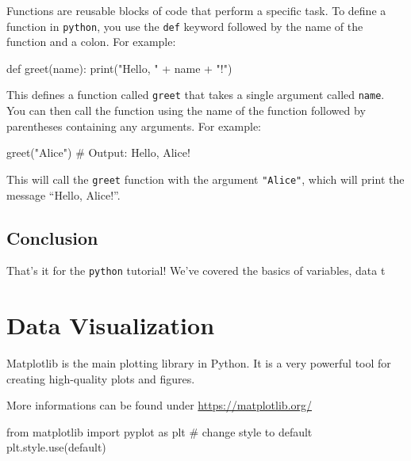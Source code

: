 \documentclass[
  letterpaper,
]{article}
\newenvironment{Shaded}{\begin{snugshade}}{\end{snugshade}}
\newcommand{\BuiltInTok}[1]{\textcolor[rgb]{0.00,0.23,0.31}{#1}}
\newcommand{\CommentTok}[1]{\textcolor[rgb]{0.37,0.37,0.37}{#1}}
\newcommand{\ImportTok}[1]{\textcolor[rgb]{0.00,0.46,0.62}{#1}}
\newcommand{\KeywordTok}[1]{\textcolor[rgb]{0.00,0.23,0.31}{#1}}
\newcommand{\NormalTok}[1]{\textcolor[rgb]{0.00,0.23,0.31}{#1}}
\newcommand{\OperatorTok}[1]{\textcolor[rgb]{0.37,0.37,0.37}{#1}}
\newcommand{\StringTok}[1]{\textcolor[rgb]{0.13,0.47,0.30}{#1}}
\begin{document}
Functions are reusable blocks of code that perform a specific task. To
define a function in \texttt{python}, you use the \texttt{def} keyword
followed by the name of the function and a colon. For example:

\begin{Shaded}
\begin{Highlighting}[]
\KeywordTok{def}\NormalTok{ greet(name):}
  \BuiltInTok{print}\NormalTok{(}\StringTok{"Hello, "} \OperatorTok{+}\NormalTok{ name }\OperatorTok{+} \StringTok{"!"}\NormalTok{)}
\end{Highlighting}
\end{Shaded}

This defines a function called \texttt{greet} that takes a single
argument called \texttt{name}. You can then call the function using the
name of the function followed by parentheses containing any arguments.
For example:

\begin{Shaded}
\begin{Highlighting}[]
\NormalTok{greet(}\StringTok{"Alice"}\NormalTok{) }\CommentTok{\# Output: Hello, Alice!}
\end{Highlighting}
\end{Shaded}

This will call the \texttt{greet} function with the argument
\texttt{"Alice"}, which will print the message ``Hello, Alice!''.

\hypertarget{conclusion}{%
\subsection{Conclusion}\label{conclusion}}

That's it for the \texttt{python} tutorial! We've covered the basics of
variables, data t

\hypertarget{data-visualization}{%
\section{Data Visualization}\label{data-visualization}}

Matplotlib is the main plotting library in Python. It is a very powerful
tool for creating high-quality plots and figures.

More informations can be found under \url{https://matplotlib.org/}

\begin{Shaded}
\begin{Highlighting}[]
\ImportTok{from}\NormalTok{ matplotlib }\ImportTok{import}\NormalTok{ pyplot }\ImportTok{as}\NormalTok{ plt}
\CommentTok{\# change style to default }
\NormalTok{plt.style.use(}\StringTok{\textquotesingle{}default\textquotesingle{}}\NormalTok{)}
\end{Highlighting}
\end{Shaded}
\end{document}
